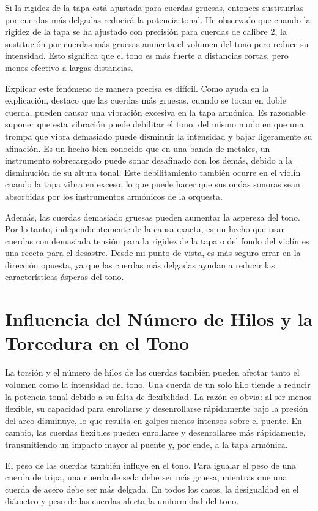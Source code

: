 \documentclass[12pt]{book}
\begin{document}
Si la rigidez de la tapa está ajustada para cuerdas gruesas, entonces sustituirlas por cuerdas más delgadas reducirá la potencia tonal. He observado que cuando la rigidez de la tapa se ha ajustado con precisión para cuerdas de calibre 2, la sustitución por cuerdas más gruesas aumenta el volumen del tono pero reduce su intensidad. Esto significa que el tono es más fuerte a distancias cortas, pero menos efectivo a largas distancias.

Explicar este fenómeno de manera precisa es difícil. Como ayuda en la explicación, destaco que las cuerdas más gruesas, cuando se tocan en doble cuerda, pueden causar una vibración excesiva en la tapa armónica. Es razonable suponer que esta vibración puede debilitar el tono, del mismo modo en que una trompa que vibra demasiado puede disminuir la intensidad y bajar ligeramente su afinación. Es un hecho bien conocido que en una banda de metales, un instrumento sobrecargado puede sonar desafinado con los demás, debido a la disminución de su altura tonal. Este debilitamiento también ocurre en el violín cuando la tapa vibra en exceso, lo que puede hacer que sus ondas sonoras sean absorbidas por los instrumentos armónicos de la orquesta.

Además, las cuerdas demasiado gruesas pueden aumentar la aspereza del tono. Por lo tanto, independientemente de la causa exacta, es un hecho que usar cuerdas con demasiada tensión para la rigidez de la tapa o del fondo del violín es una receta para el desastre. Desde mi punto de vista, es más seguro errar en la dirección opuesta, ya que las cuerdas más delgadas ayudan a reducir las características ásperas del tono.

\section*{Influencia del Número de Hilos y la Torcedura en el Tono}

La torsión y el número de hilos de las cuerdas también pueden afectar tanto el volumen como la intensidad del tono. Una cuerda de un solo hilo tiende a reducir la potencia tonal debido a su falta de flexibilidad. La razón es obvia: al ser menos flexible, su capacidad para enrollarse y desenrollarse rápidamente bajo la presión del arco disminuye, lo que resulta en golpes menos intensos sobre el puente. En cambio, las cuerdas flexibles pueden enrollarse y desenrollarse más rápidamente, transmitiendo un impacto mayor al puente y, por ende, a la tapa armónica.

El peso de las cuerdas también influye en el tono. Para igualar el peso de una cuerda de tripa, una cuerda de seda debe ser más gruesa, mientras que una cuerda de acero debe ser más delgada. En todos los casos, la desigualdad en el diámetro y peso de las cuerdas afecta la uniformidad del tono.
\end{document}
